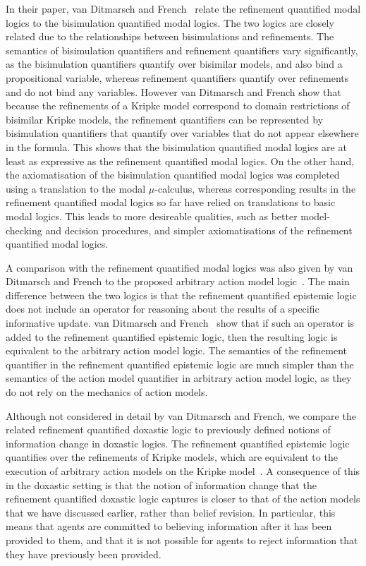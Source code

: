 In their paper, van Ditmarsch and French~\cite{french2009simulation} relate the
refinement quantified modal logics to the bisimulation quantified modal logics.
The two logics are closely related due to the relationships between
bisimulations and refinements. The semantics of
bisimulation quantifiers and refinement quantifiers vary significantly, as the
bisimulation quantifiers quantify over bisimilar models, and also bind a
propositional variable, whereas refinement quantifiers quantify over refinements
and do not bind any variables. However van Ditmarsch and French show that
because the refinements of a Kripke model correspond to domain restrictions of
bisimilar Kripke models, the refinement quantifiers can be represented by
bisimulation quantifiers that quantify over variables that do not appear
elsewhere in the formula. This shows that the bisimulation quantified modal
logics are at least as expressive as the refinement quantified modal logics.
On the other hand, the axiomatisation of the bisimulation quantified modal
logics was completed using a translation to the modal $\mu$-calculus, whereas
corresponding results in the refinement quantified modal logics so far have
relied on translations to basic modal logics. This leads to more desireable
qualities, such as better model-checking and decision procedures, and simpler
axiomatisations of the refinement quantified modal logics.

A comparison with the refinement quantified modal logics was also given by van
Ditmarsch and French to the proposed arbitrary action model
logic~\cite{french2009simulation}. The main difference between the two logics is
that the refinement quantified epistemic logic does not include an operator for
reasoning about the results of a specific informative update. van Ditmarsch and
French~\cite{french2009simulation} show that if such an operator is added to the
refinement quantified epistemic logic, then the resulting logic is equivalent to
the arbitrary action model logic. The semantics of the refinement quantifier in
the refinement quantified epistemic logic are much simpler than the semantics of
the action model quantifier in arbitrary action model logic, as they do not rely
on the mechanics of action models.

Although not considered in detail by van Ditmarsch and French, we compare the
related refinement quantified doxastic logic to previously defined notions of
information change in doxastic logics. The refinement quantified epistemic logic
quantifies over the refinements of Kripke models, which are equivalent to the
execution of arbitrary action models on the Kripke
model~\cite{french2009simulation}. A consequence of this in the doxastic setting
is that the notion of information change that the refinement quantified doxastic
logic captures is closer to that of the action models that we have discussed
earlier, rather than belief revision. In particular, this means that agents are
committed to believing information after it has been provided to them, and that
it is not possible for agents to reject information that they have previously
been provided.

